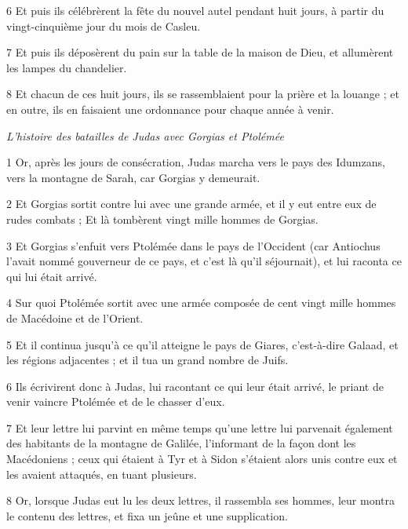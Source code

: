 \par 6 Et puis ils célébrèrent la fête du nouvel autel pendant huit jours, à partir du vingt-cinquième jour du mois de Casleu.

\par 7 Et puis ils déposèrent du pain sur la table de la maison de Dieu, et allumèrent les lampes du chandelier.

\par 8 Et chacun de ces huit jours, ils se rassemblaient pour la prière et la louange ; et en outre, ils en faisaient une ordonnance pour chaque année à venir.


\par \textit{L'histoire des batailles de Judas avec Gorgias et Ptolémée}

\par 1 Or, après les jours de consécration, Judas marcha vers le pays des Idumzans, vers la montagne de Sarah, car Gorgias y demeurait.

\par 2 Et Gorgias sortit contre lui avec une grande armée, et il y eut entre eux de rudes combats ; Et là tombèrent vingt mille hommes de Gorgias.

\par 3 Et Gorgias s'enfuit vers Ptolémée dans le pays de l'Occident (car Antiochus l'avait nommé gouverneur de ce pays, et c'est là qu'il séjournait), et lui raconta ce qui lui était arrivé.

\par 4 Sur quoi Ptolémée sortit avec une armée composée de cent vingt mille hommes de Macédoine et de l'Orient.

\par 5 Et il continua jusqu'à ce qu'il atteigne le pays de Giares, c'est-à-dire Galaad, et les régions adjacentes ; et il tua un grand nombre de Juifs.

\par 6 Ils écrivirent donc à Judas, lui racontant ce qui leur était arrivé, le priant de venir vaincre Ptolémée et de le chasser d'eux.

\par 7 Et leur lettre lui parvint en même temps qu'une lettre lui parvenait également des habitants de la montagne de Galilée, l'informant de la façon dont les Macédoniens ; ceux qui étaient à Tyr et à Sidon s'étaient alors unis contre eux et les avaient attaqués, en tuant plusieurs.

\par 8 Or, lorsque Judas eut lu les deux lettres, il rassembla ses hommes, leur montra le contenu des lettres, et fixa un jeûne et une supplication.

